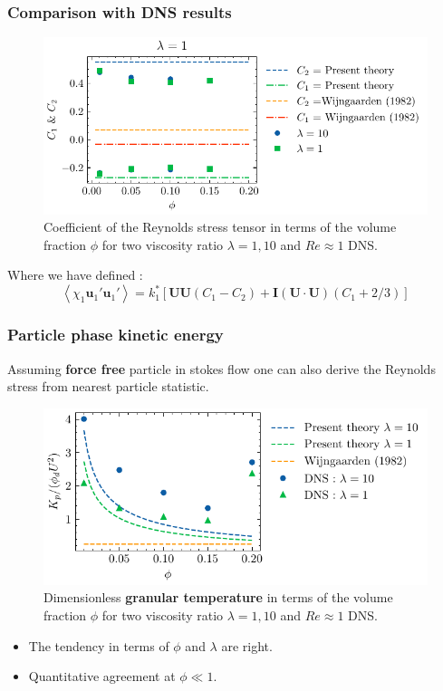 \documentclass{sintefbeamer}
\newcommand{\avg}[1]{\left<#1\right>}
\begin{document}
\begin{frame}
  \frametitle{Comparison with DNS results }
  \begin{figure}[h!]
    \centering    
    \includegraphics[height = 0.25\textwidth]{image/HOMOGENEOUS/fCA/Pseudo_turbe_coef.pdf}
    \caption{
       Coefficient of the Reynolds stress tensor in terms of the volume fraction $\phi$ for two viscosity ratio $\lambda =1,10$ and $Re \approx 1$ DNS. 
    }
    \label{fig:Cp}
\end{figure}  
Where we have defined :
\begin{equation*}
  \avg{\chi_1\textbf{u}_1'\textbf{u}_1'}
  = k^*_1 \left[
      \textbf{U}
      \textbf{U}
      (C_1  - C_2 )
      + \textbf{I} 
      (\textbf{U}\cdot\textbf{U})  (C_1+2/3) 
  \right]
\end{equation*}
\end{frame}


\begin{frame}
  \frametitle{Particle phase kinetic energy}
  Assuming \textbf{force free} particle in stokes flow one can also derive the Reynolds stress from nearest particle statistic. 
  \begin{figure}[h!]
    \centering    
    \includegraphics[height = 0.25\textwidth]{image/HOMOGENEOUS/fCA/Pseudo_turbeP.pdf}
    \caption{
       Dimensionless \textbf{granular temperature} in terms of the volume fraction $\phi$ for two viscosity ratio $\lambda =1,10$ and $Re \approx 1$ DNS. 
    }
    \label{fig:Cp}
\end{figure}  
\begin{itemize}
  \item The tendency in terms of $\phi$ and $\lambda$ are right.  
  \item Quantitative agreement at $\phi \ll 1$.  
\end{itemize}


\end{frame}
\end{document}
